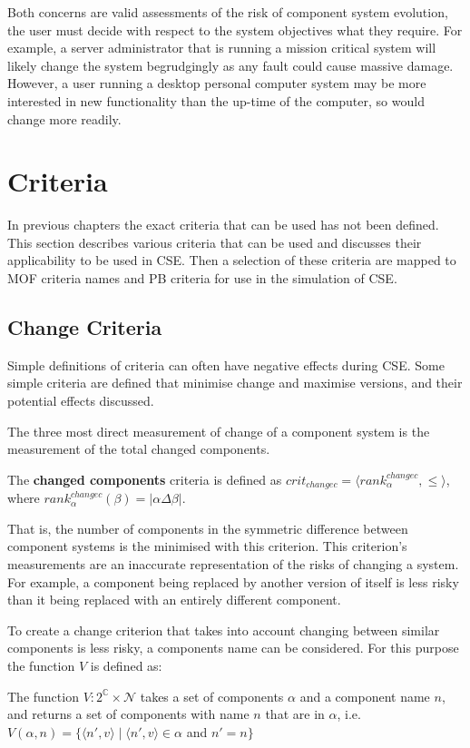 Both concerns are valid assessments of the risk of component system evolution, the user must decide with respect to the system objectives what they require. 
For example, a server administrator that is running a mission critical system will likely change the system begrudgingly as any fault could cause massive damage.
However, a user running a desktop personal computer system may be more interested in new functionality than the up-time of the computer, so would change more readily.

\section{Criteria}
In previous chapters the exact criteria that can be used has not been defined.
This section describes various criteria that can be used and discusses their applicability to be used in CSE.
Then a selection of these criteria are mapped to MOF criteria names and PB criteria for use in the simulation of CSE. 

\subsection{Change Criteria}
Simple definitions of criteria can often have negative effects during CSE.
Some simple criteria are defined that minimise change and maximise versions, and their potential effects discussed.

The three most direct measurement of change of a component system is the measurement of the total changed components.
\begin{defs}
	The \textbf{changed components} criteria is defined as $crit_{changec} = \langle rank^{changec}_{\alpha}, \leq \rangle$,
	where $rank^{changec}_{\alpha}(\beta) = |\alpha \Delta \beta|$.
\end{defs}
That is, the number of components in the symmetric difference between component systems is the minimised with this criterion.
This criterion's measurements are an inaccurate representation of the risks of changing a system.
For example, a component being replaced by another version of itself is less risky than it being replaced with an entirely different component.  

To create a change criterion that takes into account changing between similar components is less risky, a components name can be considered.
For this purpose the function $V$ is defined as: 
\begin{defs}
The function $V: 2^{\mathbb{C}} \times \mathcal{N}$ takes a set of components $\alpha$ and a component name $n$, and returns a set of components with name $n$ that are in $\alpha$,
i.e. $V(\alpha,n) = \{\langle n',v \rangle \mid \langle n',v \rangle \in \alpha $ and $ n' = n \}$
\end{defs}

